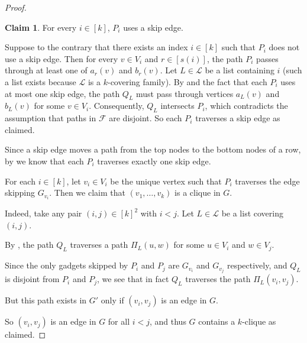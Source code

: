 \documentclass[11pt]{article}
\newcommand{\ca}{\mathcal}
\theoremstyle{definition}
\newtheorem{claim}[theorem]{Claim}
\begin{document}
\begin{proof}
        \begin{claim}
            \label{captain-skipper}
            For every $i\in [k]$, $P_i$ uses a skip edge.
        \end{claim}
        \begin{claimproof}
        Suppose to the contrary that there exists an index $i\in [k]$ such that $P_i$ does not use a skip edge.
        Then for every $v\in V_i$ and $r\in [s(i)]$, the path $P_i$ passes through  at least one of $a_r(v)$ and $b_r(v)$.
        Let $L\in\ca{L}$ be a list containing $i$ (such a list exists because
        $\ca{L}$ is a $k$-covering family).
        By  and the fact that each $P_i$ uses at most one skip edge, the path $Q_L$ must pass through vertices $a_L(v)$ and $b_L(v)$ for some $v\in V_i$.
        Consequently, $Q_L$ intersects $P_i$, which contradicts the assumption that paths in $\ca{F}$ are disjoint.
        So each $P_i$ traverses a skip edge as claimed.
        \end{claimproof}


        Since a skip edge moves a path from the top nodes to the bottom nodes of a row, by  we know that each $P_i$ traverses exactly one skip edge.    
        
        For each $i\in [k]$, let $v_i\in V_i$ be the unique vertex such that $P_i$ traverses the edge skipping $G_{v_i}$.
        Then we claim that $(v_1, \dots, v_k)$ is a clique in $G$.

        Indeed, take any pair $(i,j)\in[k]^2$ with $i<j$.
        Let $L\in\ca{L}$ be a list covering $(i,j)$.

By ,  
        the path $Q_L$ traverses a path $\Pi_L(u,w)$ for some $u\in V_i$ and $w\in V_j$.
        
        Since the only gadgets skipped by $P_i$ and $P_j$ are $G_{v_i}$ and $G_{v_j}$ respectively, and $Q_L$ is disjoint from $P_i$ and $P_j$, we see that in fact $Q_L$ traverses the path $\Pi_L(v_i,v_j)$.
        
        But this path exists in $G'$ only if $(v_i,v_j)$ is an edge in $G$.
        
        So $(v_i,v_j)$ is an edge in $G$ for all $i<j$, and thus $G$ contains a $k$-clique as claimed.        
    \end{proof}
\end{document}
